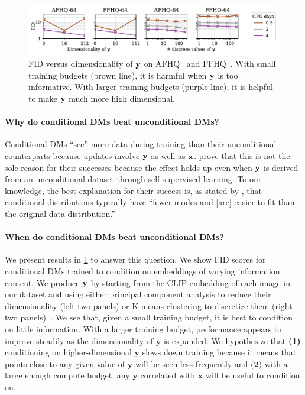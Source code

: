 \begin{figure}[t]
    \centering
    \includegraphics[width=\textwidth]{figs/2sdm/cond-results-vs-nclusters.pdf}
    \caption{FID versus dimensionality of ${\mathbf{y}}$ on AFHQ~\citep{choi2020stargan} and FFHQ~\citep{karras2018style}. With small training budgets (brown line), it is harmful when ${\mathbf{y}}$ is too informative. With larger training budgets (purple line), it is helpful to make ${\mathbf{y}}$ much more high dimensional.}
    \label{fig:fid-vs-ncomp}
\end{figure}

\paragraph{Why do conditional DMs beat unconditional DMs?}

Conditional DMs ``see'' more data during training than their unconditional counterparts because updates involve ${\mathbf{y}}$ as well as ${\mathbf{x}}$. \citet{bao2022conditional,hu2022self} prove that this is not the sole reason for their successes because the effect holds up even when ${\mathbf{y}}$ is derived from an unconditional dataset through self-supervised learning.
%
To our knowledge, the best explanation for their success is, as stated by \citet{bao2022conditional}, that conditional distributions typically have ``fewer modes and [are] easier to fit than the original data distribution.''

\paragraph{When do conditional DMs beat unconditional DMs?}
%
We present results in \cref{fig:fid-vs-ncomp} to answer this question. We show FID scores for conditional DMs trained to condition on embeddings of varying information content. 
%
We produce ${\mathbf{y}}$ by starting from the CLIP embedding of each image in our dataset and using either principal component analysis to reduce their dimensionality (left two panels) or K-means clustering to discretize them (right two panels)~\citep{hu2022self}.
%
We see that, given a small training budget, it is best to condition on little information. With a larger training budget, performance appears to improve steadily as the dimensionality of $\mathbf{y}$ is expanded. We hypothesize that \textbf{(1)} conditioning on higher-dimensional $\mathbf{y}$ slows down training because it means that points close to any given value of $\mathbf{y}$ will be seen less frequently and $\textbf{(2)}$ with a large enough compute budget, any $\mathbf{y}$ correlated with $\mathbf{x}$ will be useful to condition on.



